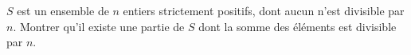 $S$ est un ensemble de $n$ entiers strictement positifs, dont aucun n'est divisible par $n$. Montrer qu'il existe une partie de $S$ dont la somme des éléments est divisible par $n$.
